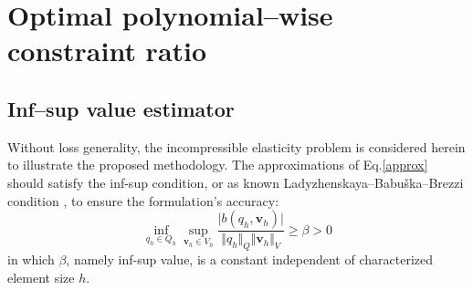 \section{Optimal polynomial--wise constraint ratio}
\subsection{Inf--sup value estimator}

Without loss generality, the incompressible elasticity problem is considered herein to illustrate the proposed methodology.
The approximations of Eq.\eqref{approx} should satisfy the inf-sup condition, or as known Ladyzhenskaya–Babuška–Brezzi condition \cite{bathe1996}, to ensure the formulation's accuracy:
\begin{equation}\label{infsup}
    \inf_{q_h \in Q_h} \sup_{\boldsymbol v_h \in V_h} \frac{\vert b(q_h,\boldsymbol v_h) \vert}{\Vert q_h \Vert_Q \Vert \boldsymbol v_h \Vert_V} \ge \beta > 0
\end{equation}
in which $\beta$, namely inf-sup value, is a constant independent of characterized element size $h$.

